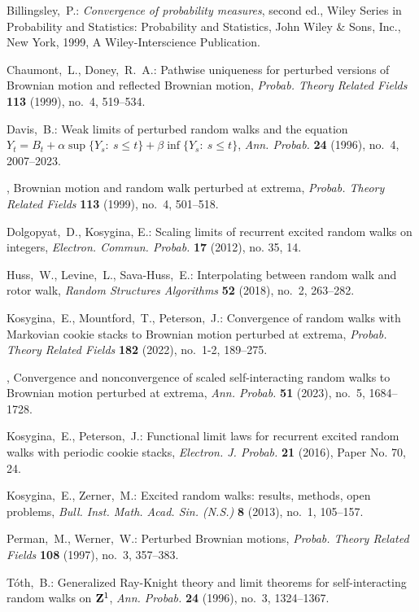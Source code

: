 \documentclass[EJP]{ejpecp} %
\begin{document}
\begin{thebibliography}{10}

Billingsley,~P.: \emph{Convergence of probability measures}, second ed., Wiley Series in Probability and Statistics: Probability and Statistics, John Wiley \& Sons, Inc., New York, 1999, A Wiley-Interscience Publication. 

Chaumont,~L., Doney,~R.~A.: Pathwise uniqueness for perturbed versions of {B}rownian motion and reflected {B}rownian motion, \emph{Probab. Theory Related Fields} \textbf{113} (1999), no.~4, 519--534. 

Davis,~B.: Weak limits of perturbed random walks and the equation {$Y_t=B_t+\alpha\sup\{Y_s\colon\ s\leq t\}+\beta\inf\{Y_s\colon\ s\leq t\}$}, \emph{Ann. Probab.} \textbf{24} (1996), no.~4, 2007--2023. 

\bysame, Brownian motion and random walk perturbed at extrema, \emph{Probab. Theory Related Fields} \textbf{113} (1999), no.~4, 501--518. 

Dolgopyat,~D., Kosygina, E.: Scaling limits of recurrent excited random walks on integers, \emph{Electron. Commun. Probab.} \textbf{17} (2012), no. 35, 14. 

Huss,~W., Levine,~L., Sava-Huss,~E.: Interpolating between random walk and rotor walk, \emph{Random Structures Algorithms} \textbf{52} (2018), no.~2, 263--282. 

Kosygina,~E., Mountford,~T., Peterson,~J.: Convergence of random walks with {M}arkovian cookie stacks to {B}rownian motion perturbed at extrema, \emph{Probab. Theory Related Fields} \textbf{182} (2022), no.~1-2, 189--275. 

\bysame, Convergence and nonconvergence of scaled self-interacting random walks to {B}rownian motion perturbed at extrema, \emph{Ann. Probab.} \textbf{51} (2023), no.~5, 1684--1728. 

Kosygina,~E., Peterson,~J.: Functional limit laws for recurrent excited random walks with periodic cookie stacks, \emph{Electron. J. Probab.} \textbf{21} (2016), Paper No. 70, 24. 

Kosygina,~E., Zerner,~M.: Excited random walks: results, methods, open problems, \emph{Bull. Inst. Math. Acad. Sin. (N.S.)} \textbf{8} (2013), no.~1, 105--157. 

Perman,~M., Werner,~W.: Perturbed {B}rownian motions, \emph{Probab. Theory Related Fields} \textbf{108} (1997), no.~3, 357--383. 

T\'{o}th,~B.: Generalized {R}ay-{K}night theory and limit theorems for self-interacting random walks on {${\bf Z}^1$}, \emph{Ann. Probab.} \textbf{24} (1996), no.~3, 1324--1367. 

\end{thebibliography}
\end{document}
